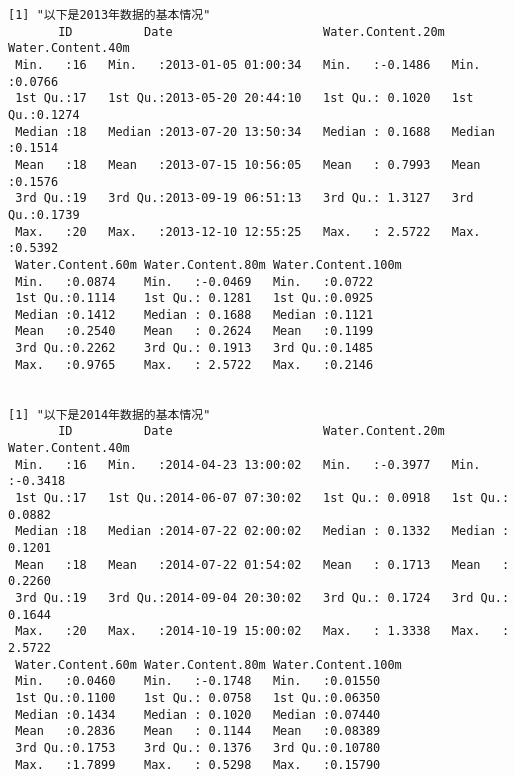 \documentclass[11pt]{article}
\begin{document}
    \begin{Verbatim}[commandchars=\\\{\}]
[1] "以下是2013年数据的基本情况"
       ID          Date                     Water.Content.20m Water.Content.40m
 Min.   :16   Min.   :2013-01-05 01:00:34   Min.   :-0.1486   Min.   :0.0766   
 1st Qu.:17   1st Qu.:2013-05-20 20:44:10   1st Qu.: 0.1020   1st Qu.:0.1274   
 Median :18   Median :2013-07-20 13:50:34   Median : 0.1688   Median :0.1514   
 Mean   :18   Mean   :2013-07-15 10:56:05   Mean   : 0.7993   Mean   :0.1576   
 3rd Qu.:19   3rd Qu.:2013-09-19 06:51:13   3rd Qu.: 1.3127   3rd Qu.:0.1739   
 Max.   :20   Max.   :2013-12-10 12:55:25   Max.   : 2.5722   Max.   :0.5392   
 Water.Content.60m Water.Content.80m Water.Content.100m
 Min.   :0.0874    Min.   :-0.0469   Min.   :0.0722    
 1st Qu.:0.1114    1st Qu.: 0.1281   1st Qu.:0.0925    
 Median :0.1412    Median : 0.1688   Median :0.1121    
 Mean   :0.2540    Mean   : 0.2624   Mean   :0.1199    
 3rd Qu.:0.2262    3rd Qu.: 0.1913   3rd Qu.:0.1485    
 Max.   :0.9765    Max.   : 2.5722   Max.   :0.2146    


[1] "以下是2014年数据的基本情况"
       ID          Date                     Water.Content.20m Water.Content.40m
 Min.   :16   Min.   :2014-04-23 13:00:02   Min.   :-0.3977   Min.   :-0.3418  
 1st Qu.:17   1st Qu.:2014-06-07 07:30:02   1st Qu.: 0.0918   1st Qu.: 0.0882  
 Median :18   Median :2014-07-22 02:00:02   Median : 0.1332   Median : 0.1201  
 Mean   :18   Mean   :2014-07-22 01:54:02   Mean   : 0.1713   Mean   : 0.2260  
 3rd Qu.:19   3rd Qu.:2014-09-04 20:30:02   3rd Qu.: 0.1724   3rd Qu.: 0.1644  
 Max.   :20   Max.   :2014-10-19 15:00:02   Max.   : 1.3338   Max.   : 2.5722  
 Water.Content.60m Water.Content.80m Water.Content.100m
 Min.   :0.0460    Min.   :-0.1748   Min.   :0.01550   
 1st Qu.:0.1100    1st Qu.: 0.0758   1st Qu.:0.06350   
 Median :0.1434    Median : 0.1020   Median :0.07440   
 Mean   :0.2836    Mean   : 0.1144   Mean   :0.08389   
 3rd Qu.:0.1753    3rd Qu.: 0.1376   3rd Qu.:0.10780   
 Max.   :1.7899    Max.   : 0.5298   Max.   :0.15790   


    \end{Verbatim}

    \begin{center}
    \end{center}
    { \hspace*{\fill} \\}
    
\end{document}
